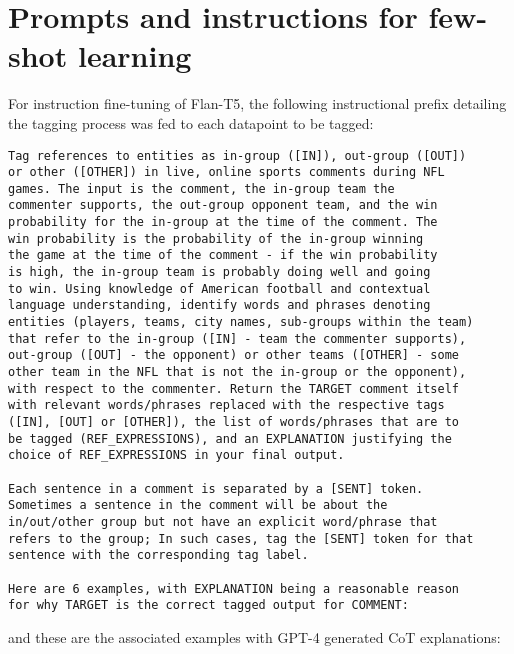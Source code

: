\chapter{Prompts and instructions for few-shot learning}
\label{appendix:prompts}

For instruction fine-tuning of Flan-T5, the following instructional prefix detailing the tagging process was fed to each datapoint to be tagged:

\begin{verbatim}
Tag references to entities as in-group ([IN]), out-group ([OUT]) 
or other ([OTHER]) in live, online sports comments during NFL 
games. The input is the comment, the in-group team the 
commenter supports, the out-group opponent team, and the win 
probability for the in-group at the time of the comment. The 
win probability is the probability of the in-group winning 
the game at the time of the comment - if the win probability 
is high, the in-group team is probably doing well and going 
to win. Using knowledge of American football and contextual 
language understanding, identify words and phrases denoting 
entities (players, teams, city names, sub-groups within the team) 
that refer to the in-group ([IN] - team the commenter supports), 
out-group ([OUT] - the opponent) or other teams ([OTHER] - some 
other team in the NFL that is not the in-group or the opponent), 
with respect to the commenter. Return the TARGET comment itself 
with relevant words/phrases replaced with the respective tags 
([IN], [OUT] or [OTHER]), the list of words/phrases that are to 
be tagged (REF_EXPRESSIONS), and an EXPLANATION justifying the 
choice of REF_EXPRESSIONS in your final output.

Each sentence in a comment is separated by a [SENT] token. 
Sometimes a sentence in the comment will be about the 
in/out/other group but not have an explicit word/phrase that 
refers to the group; In such cases, tag the [SENT] token for that 
sentence with the corresponding tag label.

Here are 6 examples, with EXPLANATION being a reasonable reason 
for why TARGET is the correct tagged output for COMMENT:
\end{verbatim}

and these are the associated examples with GPT-4 generated CoT explanations:

